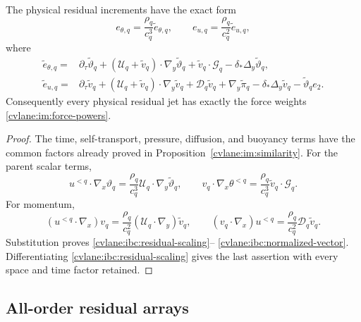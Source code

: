 \begin{cvlaneproposition}\label{cvlane:ibc:normalized-residual}
The physical residual increments have the exact form
\begin{equation}\label{cvlane:ibc:residual-scaling}
 e_{\theta,q}=\frac{\rho_q}{c_q^3}\widetilde e_{\theta,q},
 \qquad
 e_{u,q}=\frac{\rho_q}{c_q^2}\widetilde e_{u,q},
\end{equation}
where
\begin{align}
 \widetilde e_{\theta,q}={}&
 \partial_\tau\widetilde\vartheta_q
 +(\mathcal U_q+\widetilde v_q)\cdot
       \nabla_y\widetilde\vartheta_q
 +\widetilde v_q\cdot\mathcal G_q
 -\delta_*\Delta_y\widetilde\vartheta_q,
 \label{cvlane:ibc:normalized-scalar}\\
 \widetilde e_{u,q}={}&
 \partial_\tau\widetilde v_q
 +(\mathcal U_q+\widetilde v_q)\cdot\nabla_y\widetilde v_q
 +\mathcal D_q\widetilde v_q+\nabla_y\widetilde\pi_q
 -\delta_*\Delta_y\widetilde v_q
 -\widetilde\vartheta_qe_2.
 \label{cvlane:ibc:normalized-vector}
\end{align}
Consequently every physical residual jet has exactly the force weights
\eqref{cvlane:im:force-powers}.
\end{cvlaneproposition}

\begin{proof}
The time, self-transport, pressure, diffusion, and buoyancy terms have the
common factors already proved in Proposition~\ref{cvlane:im:similarity}.  For the
parent scalar terms,
\[
 u^{<q}\cdot\nabla_x\vartheta_q
 =\frac{\rho_q}{c_q^3}\mathcal U_q\cdot
       \nabla_y\widetilde\vartheta_q,\qquad
 v_q\cdot\nabla_x\theta^{<q}
 =\frac{\rho_q}{c_q^3}\widetilde v_q\cdot\mathcal G_q.
\]
For momentum,
\[
 (u^{<q}\cdot\nabla_x)v_q
 =\frac{\rho_q}{c_q^2}(\mathcal U_q\cdot\nabla_y)
       \widetilde v_q,\qquad
 (v_q\cdot\nabla_x)u^{<q}
 =\frac{\rho_q}{c_q^2}\mathcal D_q\widetilde v_q.
\]
Substitution proves \eqref{cvlane:ibc:residual-scaling}--
\eqref{cvlane:ibc:normalized-vector}.  Differentiating
\eqref{cvlane:ibc:residual-scaling} gives the last assertion with every space and
time factor retained.
\end{proof}

\subsection{All-order residual arrays}

